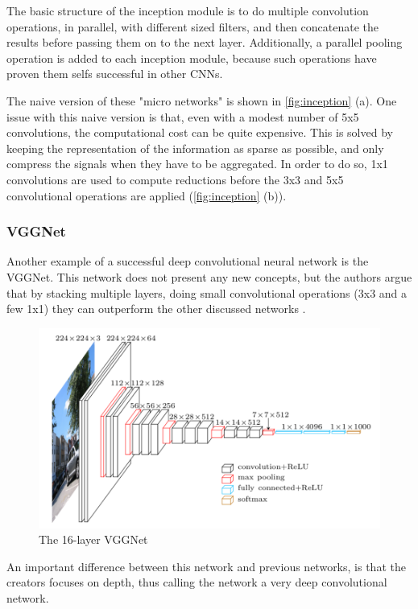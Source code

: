 The basic structure of the inception module is to do multiple convolution operations, in parallel, with different sized filters, and then concatenate the results before passing them on to the next layer. Additionally, a parallel pooling operation is added to each inception module, because such operations have proven them selfs successful in other CNNs.

The naive version of these "micro networks" is shown in \autoref{fig:inception} (a). One issue with this naive version is that, even with a modest number of 5x5 convolutions, the computational cost can be quite expensive. This is solved by keeping the representation of the information as sparse as possible, and only compress the signals when they have to be aggregated. In order to do so, 1x1 convolutions are used to compute reductions before the 3x3 and 5x5 convolutional operations are applied (\autoref{fig:inception} (b)).

\subsubsection{VGGNet}
Another example of a successful deep convolutional neural network is the VGGNet. This network does not present any new concepts, but the authors argue that by stacking multiple layers, doing small convolutional operations (3x3 and a few 1x1) they can outperform the other discussed networks \citep{Simonyan2014}.

\begin{figure}[!h]
	\centering
	\includegraphics[scale=0.7]{fig/vgg16.png}
	\caption{The 16-layer VGGNet \citep{Frossard2016}}
	\label{fig:inception}
\end{figure}

An important difference between this network and previous networks, is that the creators focuses on depth, thus calling the network a very deep convolutional network.

